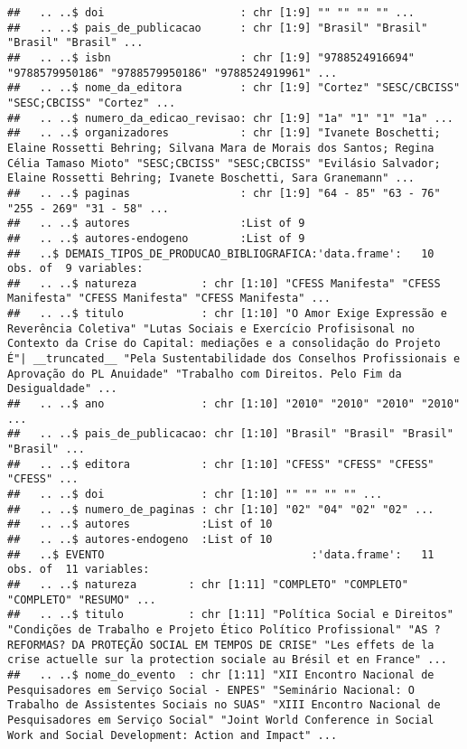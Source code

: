 \documentclass[]{article}
\begin{document}
\begin{verbatim}
##   .. ..$ doi                     : chr [1:9] "" "" "" "" ...
##   .. ..$ pais_de_publicacao      : chr [1:9] "Brasil" "Brasil" "Brasil" "Brasil" ...
##   .. ..$ isbn                    : chr [1:9] "9788524916694" "9788579950186" "9788579950186" "9788524919961" ...
##   .. ..$ nome_da_editora         : chr [1:9] "Cortez" "SESC/CBCISS" "SESC;CBCISS" "Cortez" ...
##   .. ..$ numero_da_edicao_revisao: chr [1:9] "1a" "1" "1" "1a" ...
##   .. ..$ organizadores           : chr [1:9] "Ivanete Boschetti; Elaine Rossetti Behring; Silvana Mara de Morais dos Santos; Regina Célia Tamaso Mioto" "SESC;CBCISS" "SESC;CBCISS" "Evilásio Salvador; Elaine Rossetti Behring; Ivanete Boschetti, Sara Granemann" ...
##   .. ..$ paginas                 : chr [1:9] "64 - 85" "63 - 76" "255 - 269" "31 - 58" ...
##   .. ..$ autores                 :List of 9
##   .. ..$ autores-endogeno        :List of 9
##   ..$ DEMAIS_TIPOS_DE_PRODUCAO_BIBLIOGRAFICA:'data.frame':   10 obs. of  9 variables:
##   .. ..$ natureza          : chr [1:10] "CFESS Manifesta" "CFESS Manifesta" "CFESS Manifesta" "CFESS Manifesta" ...
##   .. ..$ titulo            : chr [1:10] "O Amor Exige Expressão e Reverência Coletiva" "Lutas Sociais e Exercício Profisisonal no Contexto da Crise do Capital: mediações e a consolidação do Projeto É"| __truncated__ "Pela Sustentabilidade dos Conselhos Profissionais e Aprovação do PL Anuidade" "Trabalho com Direitos. Pelo Fim da Desigualdade" ...
##   .. ..$ ano               : chr [1:10] "2010" "2010" "2010" "2010" ...
##   .. ..$ pais_de_publicacao: chr [1:10] "Brasil" "Brasil" "Brasil" "Brasil" ...
##   .. ..$ editora           : chr [1:10] "CFESS" "CFESS" "CFESS" "CFESS" ...
##   .. ..$ doi               : chr [1:10] "" "" "" "" ...
##   .. ..$ numero_de_paginas : chr [1:10] "02" "04" "02" "02" ...
##   .. ..$ autores           :List of 10
##   .. ..$ autores-endogeno  :List of 10
##   ..$ EVENTO                                :'data.frame':   11 obs. of  11 variables:
##   .. ..$ natureza        : chr [1:11] "COMPLETO" "COMPLETO" "COMPLETO" "RESUMO" ...
##   .. ..$ titulo          : chr [1:11] "Política Social e Direitos" "Condições de Trabalho e Projeto Ético Político Profissional" "AS ?REFORMAS? DA PROTEÇÃO SOCIAL EM TEMPOS DE CRISE" "Les effets de la crise actuelle sur la protection sociale au Brésil et en France" ...
##   .. ..$ nome_do_evento  : chr [1:11] "XII Encontro Nacional de Pesquisadores em Serviço Social - ENPES" "Seminário Nacional: O Trabalho de Assistentes Sociais no SUAS" "XIII Encontro Nacional de Pesquisadores em Serviço Social" "Joint World Conference in Social Work and Social Development: Action and Impact" ...

\end{verbatim}
\end{document}
